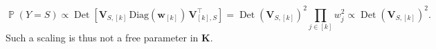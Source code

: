 \documentclass[twoside,11pt]{book}
\numberwithin{theorem}{chapter}
\numberwithin{definition}{chapter}
\numberwithin{proposition}{chapter}
\numberwithin{corollary}{chapter}
\numberwithin{example}{chapter}
\numberwithin{lemma}{chapter}
\numberwithin{assumption}{chapter}
\DeclareMathOperator{\Det}{Det}
\DeclareMathOperator{\Cor}{\mathrm{Cor}}
\DeclareMathOperator{\Tran}{\intercal}
\DeclareMathOperator{\Prb}{\mathbb{P}}
\begin{document}
\begin{equation}
\Prb (Y=S) \propto \Det \left[\bm{V}^{}_{S, [k]} \,\text{Diag}(\bm{w}_{[k]})\, \bm{V}_{[k],S}^{\Tran}\right] = \Det(\bm{V}_{S,[k]})^{2} \prod\limits_{j \in [k]} w_{j}^{2}\propto \Det(\bm{V}_{S,[k]})^{2}.
\end{equation}
Such a scaling is thus not a free parameter in $\bm{K}$.

\end{document}
